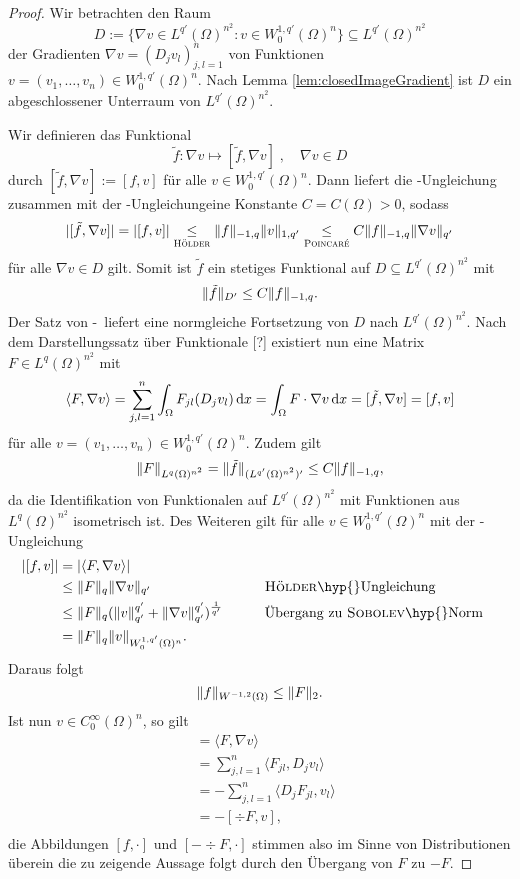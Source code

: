 \begin{proof}
  Wir betrachten den Raum
  $$
  D := \{\nabla v \in L^{q'}(\Omega)^{n^2} \colon v \in W_0^{1,q'}(\Omega)^n\} \subseteq L^{q'}(\Omega)^{n^2}
  $$
  der Gradienten $\nabla v = (D_j v_l)_{j,l=1}^n$ von Funktionen $v = (v_1,\dots,v_n) \in W_0^{1,q'}(\Omega)^n$.
  Nach Lemma \ref{lem:closedImageGradient} ist $D$ ein abgeschlossener Unterraum von $L^{q'}(\Omega)^{n^2}$.

  Wir definieren das Funktional
  $$
  \tilde f \colon \nabla v \mapsto [\tilde f, \nabla v]\;, \quad \nabla v \in D
  $$
  durch $[\tilde f, \nabla v] := [f, v]$ für alle $v \in W_0^{1,q'}(\Omega)^n$.
  Dann liefert die \hoelder\hyp{}Ungleichung zusammen mit der \poincare\hyp{}Ungleichungeine Konstante $C = C(\Omega) > 0$, sodass 
  $$
  |[\tilde f, \nabla v]| 
  = |[f, v]| 
  \underset{\hoelder}{\leq} \norm{f}_{-1,q} \norm{v}_{1,q'}
  \underset{\poincare}{\leq} C \norm{f}_{-1,q} \norm{\nabla v }_{q'}
  $$
  für alle $\nabla v \in D$ gilt.
  Somit ist $\tilde f$ ein stetiges Funktional auf $D \subseteq L^{q'}(\Omega)^{n^2}$ mit 
  $$\norm{\tilde f}_{D'} \leq C\norm{f}_{-1,q}.$$
  Der Satz von \hahn\hyp{}\banach\ liefert eine normgleiche Fortsetzung von $D$ nach $L^{q'}(\Omega)^{n^2}$.
  Nach dem Darstellungssatz über Funktionale \cite{werner2011fa}[?] existiert nun eine Matrix $F \in L^{q}(\Omega)^{n^2}$ mit
  $$
  \langle F, \nabla v \rangle
  = \sum_{j,l=1}^n \int_\Omega F_{jl}(D_j v_l) \d x
  = \int_\Omega F \cdot \nabla v \d x
  = [\tilde f, \nabla v] 
  = [f, v]
  $$
  für alle $v = (v_1,\dots,v_n) \in W_0^{1,q'}(\Omega)^n$.
  Zudem gilt
  $$ \norm{F}_{L^q(\Omega)^{n^2}} = \norm{\tilde f}_{(L^{q'}(\Omega)^{n^2})'} \leq C \norm{f}_{-1,q},$$
  da die Identifikation von Funktionalen auf $L^{q'}(\Omega)^{n^2}$ mit Funktionen aus $L^q(\Omega)^{n^2}$ isometrisch ist.
  Des Weiteren gilt für alle $v \in W_0^{1,q'}(\Omega)^n$ mit der \hoelder\hyp{}Ungleichung
  \begin{alignat*}{2}
    |[f,v]| 
    &= |\langle F, \nabla v\rangle|  \\
    &\leq \norm{F}_q \norm{\nabla v}_{q'}  \qquad &&\text{\hoelder\hyp{}Ungleichung}\\
    &\leq \norm{F}_q (\norm{v}_{q'}^{q'} + \norm{\nabla v}_{q'}^{q'})^{\frac{1}{q'}} \qquad &&\text{Übergang zu \sobolev\hyp{}Norm}\\
    &= \norm{F}_q \norm{v}_{W_0^{1,q'}(\Omega)^n}.
  \end{alignat*}
  Daraus folgt
  $$
  \norm{f}_{W^{-1,2}(\Omega)} \leq \norm{F}_2.
  $$
  Ist nun $v \in C_0^\infty(\Omega)^n$, so gilt
  \begin{align*}
    [f,v]
    &= \langle F, \nabla v\rangle \\
    &= \sum_{j,l=1}^n \langle F_{jl}, D_j v_l \rangle \\
    &= -\sum_{j,l=1}^n \langle D_j F_{jl}, v_l \rangle \\
    &= -[\div F, v], \\
  \end{align*}
  die Abbildungen $[f,\cdot]$ und $[-\div F, \cdot]$ stimmen also im Sinne von Distributionen überein die zu zeigende Aussage folgt durch den Übergang von $F$ zu $-F$.
\end{proof}

